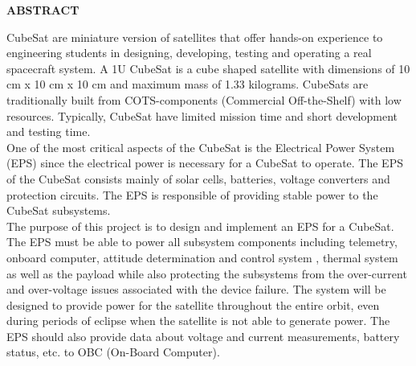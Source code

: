 \thispagestyle{plain}

\begin{center}
	\Large {\bf \uppercase{ABSTRACT}}
\end{center}

\vspace{3\baselineskip}

\justifying
%
%
%

CubeSat are miniature version of satellites that offer hands-on experience to engineering students in designing, developing, testing and operating a real spacecraft system. A 1U CubeSat is a cube shaped satellite with dimensions of 10 cm x 10 cm x 10 cm and maximum mass of 1.33 kilograms. CubeSats are traditionally built from COTS-components (Commercial Off-the-Shelf) with low resources. Typically, CubeSat have limited mission time and short development and testing time. 
\\
One of the most critical aspects of the CubeSat is the Electrical Power System (EPS) since the electrical power is necessary for a CubeSat to operate. The EPS of the CubeSat consists mainly of solar cells, batteries, voltage converters and protection circuits. The EPS is responsible of providing stable power to the CubeSat subsystems.
\\
The purpose of this project is to design and implement an EPS for a CubeSat. The EPS must be able to power all subsystem components including telemetry, onboard computer, attitude determination and control system , thermal system as well as the payload while also protecting the subsystems from the over-current and over-voltage issues associated with the device failure. The system will be designed to provide power for the satellite throughout the entire orbit, even during periods of eclipse when the satellite is not able to generate power. The EPS should also provide data about voltage and current measurements, battery status, etc. to OBC (On-Board Computer).



